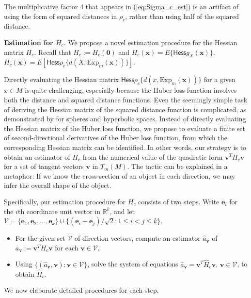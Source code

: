 \documentclass[preprint]{imsart}
\newcommand{\cV}{\mathcal{V}}
\def\ev{\mathbf e}
\def\vv{\mathbf v}
\def\xv{\mathbf x}
\theoremstyle{plain}
\theoremstyle{remark}
\begin{document}
\begin{appendix}
The multiplicative factor 4 that appears in (\ref{eq:Sigma_c_est}) is an artifact of using the form of squared distances in $\rho_c$, rather than using half of the squared distance. 

\textbf{Estimation for $H_{c}$}. 
We propose a novel estimation procedure for the Hessian matrix $H_{c}$. Recall that $H_c := H_c(\mathbf{0})$ and $H_c(\xv)  = E \{ \textsf{Hess} g_X(\xv) \}$. 
$H_c(\xv) = E[\textsf{Hess} \rho_c\{ d(X, \mbox{Exp}_{m}(\xv))\}]$.
 
Directly evaluating the Hessian matrix 
$\textsf{Hess} \rho_c\{ d(x, \mbox{Exp}_{m}(\xv))\}$ for a given $x \in M$ is quite challenging, especially because the Huber loss function involves both the distance and squared distance functions. Even the seemingly simple task of deriving the Hessian matrix of the squared distance function is complicated, as demonstrated by \cite{pennec2018barycentric} for spheres and hyperbolic spaces. Instead of directly evaluating the Hessian matrix of the Huber loss function, we propose to evaluate a finite set of second-directional derivatives of the Huber loss function, from which the corresponding Hessian matrix can be identified. In other words, our strategy is to obtain an estimator of ${H}_{c}$ from the numerical value of the quadratic form $\mathbf{v}^{T}{H}_{c}\mathbf{v}$ for a set of tangent vectors $\mathbf{v}$ in $T_m(M)$. The tactic can be explained in a metaphor: If we know the cross-section of an object in each direction, we may infer the overall shape of the object.

Specifically, our estimation procedure for $H_c$ consists of two steps. Write $\ev_i$ for the $i$th coordinate unit vector in $\mathbb{R}^k$, and let $\cV = \{\ev_1, \ev_2, \ldots, \ev_k\} \cup\{ (\ev_i + \ev_j)/\sqrt{2} : 1\le i < j \le k \}$. 
\begin{itemize}
    \item[Step 1.] For the given set  $\cV$ of direction vectors, compute an estimator $\hat{a}_{\vv}$ of $a_{\vv} := \vv^T {H_c} \vv$ for each $\vv \in \cV$.
    \item[Step 2.] Using $\{ (\hat{a}_{\vv}, \vv): \vv \in \cV  \}$, solve the system of equations $\hat{a}_{\vv} = \vv^T \hat{H}_c \vv$, $\vv \in \cV$, 
to obtain $\hat{H}_c$. 
\end{itemize}
 
We now elaborate detailed procedures for each step. 



\end{appendix}
\end{document}

